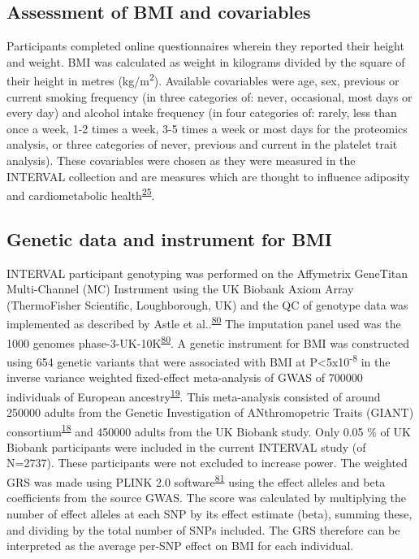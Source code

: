 \documentclass[11pt,twoside]{bristolthesis}
\begin{document}
\hypertarget{assessment-of-bmi-and-covariables}{%
\subsection{Assessment of BMI and covariables}\label{assessment-of-bmi-and-covariables}}

Participants completed online questionnaires wherein they reported their height and weight. BMI was calculated as weight in kilograms divided by the square of their height in metres (kg/m\textsuperscript{2}). Available covariables were age, sex, previous or current smoking frequency (in three categories of: never, occasional, most days or every day) and alcohol intake frequency (in four categories of: rarely, less than once a week, 1-2 times a week, 3-5 times a week or most days for the proteomics analysis, or three categories of never, previous and current in the platelet trait analysis). These covariables were chosen as they were measured in the INTERVAL collection and are measures which are thought to influence adiposity and cardiometabolic health\textsuperscript{\protect\hyperlink{ref-Bell2018a}{25}}.

\hypertarget{genetic-data-and-instrument-for-bmi}{%
\subsection{Genetic data and instrument for BMI}\label{genetic-data-and-instrument-for-bmi}}

INTERVAL participant genotyping was performed on the Affymetrix GeneTitan Multi-Channel (MC) Instrument using the UK Biobank Axiom Array (ThermoFisher Scientific, Loughborough, UK) and the QC of genotype data was implemented as described by Astle et al..\textsuperscript{\protect\hyperlink{ref-Astle2016}{80}} The imputation panel used was the 1000 genomes phase-3-UK-10K\textsuperscript{\protect\hyperlink{ref-Astle2016}{80}}. A genetic instrument for BMI was constructed using 654 genetic variants that were associated with BMI at P\textless5x10\textsuperscript{-8} in the inverse variance weighted fixed-effect meta-analysis of GWAS of 700000 individuals of European ancestry\textsuperscript{\protect\hyperlink{ref-Yengo2018}{19}}. This meta-analysis consisted of around 250000 adults from the Genetic Investigation of ANthromopetric Traits (GIANT) consortium\textsuperscript{\protect\hyperlink{ref-Locke2015}{18}} and 450000 adults from the UK Biobank study. Only 0.05 \% of UK Biobank participants were included in the current INTERVAL study (of N=2737). These participants were not excluded to increase power. The weighted GRS was made using PLINK 2.0 software\textsuperscript{\protect\hyperlink{ref-Purcell2007a}{81}} using the effect alleles and beta coefficients from the source GWAS. The score was calculated by multiplying the number of effect alleles at each SNP by its effect estimate (beta), summing these, and dividing by the total number of SNPs included. The GRS therefore can be interpreted as the average per-SNP effect on BMI for each individual.
\end{document}
